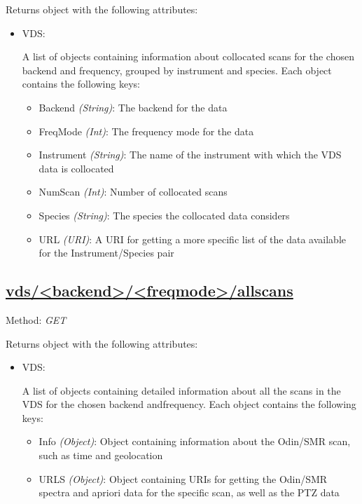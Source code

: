 Returns object with the following attributes:
\begin{itemize}
    \item VDS:

        A list of objects containing information about collocated scans for
        the chosen backend and frequency, grouped by instrument and species.
        Each object contains the following keys:

        \begin{itemize}
            \item Backend \emph{(String)}: The backend for the data
            \item FreqMode \emph{(Int)}: The frequency mode for the data
            \item Instrument \emph{(String)}: The name of the instrument with
                which the VDS data is collocated
            \item NumScan \emph{(Int)}: Number of collocated scans
            \item Species \emph{(String)}: The species the collocated data
                considers
            \item URL \emph{(URI)}: A URI for getting a more specific list of
                the data available for the Instrument/Species pair
        \end{itemize}
\end{itemize}


\subsection{\url{vds/<backend>/<freqmode>/allscans}}
Method: \emph{GET}

Returns object with the following attributes:
\begin{itemize}
    \item VDS:

        A list of objects containing detailed information about all the scans
        in the VDS for the chosen backend andfrequency.
        Each object contains the following keys:

        \begin{itemize}
            \item Info \emph{(Object)}: Object containing information
                about the Odin/SMR scan, such as time and geolocation
            \item URLS \emph{(Object)}: Object containing URIs for getting the
                Odin/SMR spectra and apriori data for the specific scan, as
                well as the PTZ data
        \end{itemize}
\end{itemize}


